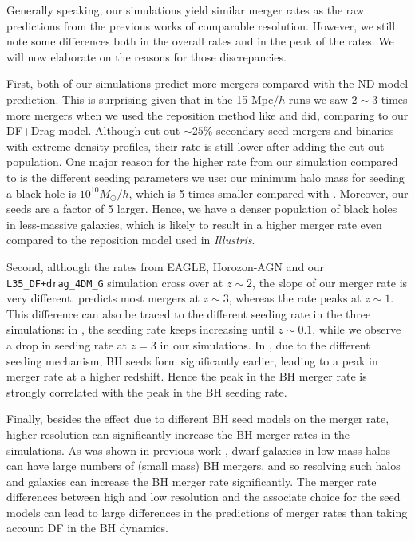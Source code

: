 Generally speaking, our simulations yield similar merger rates as the raw predictions from the previous works of comparable resolution. However, we still note some differences both in the overall rates and in the peak of the rates. We will now elaborate on the reasons for those discrepancies.

First, both of our simulations predict more mergers compared with the \cite{Katz2020} ND model prediction. This is surprising given that in the 15 Mpc$/h$ runs we saw $2\sim 3$ times more mergers when we used the reposition method like \cite{Katz2020} and \cite{Salcido2016} did, comparing to our DF+Drag model. Although \cite{Katz2020} cut out $\sim 25\%$ secondary seed mergers and binaries with extreme density profiles, their rate is still lower after adding the cut-out population. One major reason for the higher rate from our simulation compared to \cite{Katz2020} is the different seeding parameters we use: our minimum halo mass for seeding a black hole is $10^{10} M_\odot/h$, which is 5 times smaller compared with \cite{Katz2020}. Moreover, our seeds are a factor of 5 larger. Hence, we have a denser population of black holes in less-massive galaxies, which is likely to result in a higher merger rate even compared to the reposition model used in \textit{Illustris}.

Second, although the rates from EAGLE, Horozon-AGN and our \texttt{L35\_DF+drag\_4DM\_G} simulation cross over at $z\sim 2$, the slope of our merger rate is very different. \cite{Volonteri2020} predicts most mergers at $z\sim 3$, whereas the \cite{Salcido2016} rate peaks at $z\sim 1$. This difference can also be traced to the different seeding rate in the three simulations: in \cite{Salcido2016}, the seeding rate keeps increasing until $z\sim 0.1$, while we observe a drop in seeding rate at $z=3$ in our simulations. In \cite{Volonteri2020}, due to the different seeding mechanism, BH seeds form significantly earlier, leading to a peak in merger rate at a higher redshift. Hence the peak in the BH merger rate is strongly correlated with the peak in the BH seeding rate.

Finally, besides the effect due to different BH seed models on the merger rate, higher resolution can significantly increase the BH merger rates in the simulations. As was shown in previous work \citep[e.g.][]{Volonteri2020,Barausse2020}, dwarf galaxies in low-mass halos can have large numbers of (small mass) BH mergers, and so resolving such halos and galaxies can increase the BH merger rate significantly. The merger rate differences between high and low resolution and the associate choice for the seed models can lead to large differences in the predictions of merger rates than taking account DF in the BH dynamics. 
